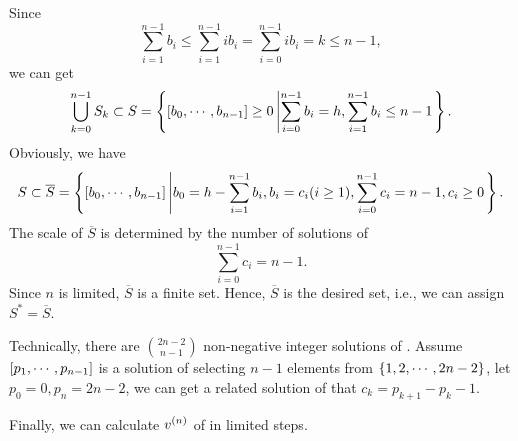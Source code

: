 Since
\begin{equation}
\sum_{i=1}^{n-1}{b_i}\le \sum_{i=1}^{n-1}{i b_i}=\sum_{i=0}^{n-1}{i b_i}=k\le n-1,
\end{equation}
we can get
\begin{equation}
\bigcup\limits_{k=0}^{n-1}S_k\subset S=\left\{\left[b_0,\cdots,b_{n-1}\right]\ge 0 \left| \sum_{i=0}^{n-1}{b_i}=h, \sum_{i=1}^{n-1}{b_i}\le n-1 \right.\right\}.
\end{equation}
Obviously, we have
\begin{equation}
S\subset \overline{S}=\left\{\left[b_0,\cdots,b_{n-1}\right]\left|b_0=h-\sum_{i=1}^{n-1}{b_i},b_i=c_i(i\ge 1),\sum_{i=0}^{n-1}c_i=n-1,c_i\ge 0\right.\right\}.
\end{equation}
The scale of $\overline{S}$ is determined by the number of solutions of
\begin{equation}
\sum_{i=0}^{n-1}c_i=n-1 \label{eqc}.
\end{equation}
Since $n$ is limited, $\overline{S}$ is a finite set.  Hence, $\overline{S}$ is the desired set, i.e., we can assign $S^*=\overline{S}$.

Technically, there are $\binom{2n-2}{n-1}$ non-negative integer solutions of . Assume  $\left[p_1,\cdots,p_{n-1}\right]$ is a solution of selecting $n-1$ elements from $\left\{1,2,\cdots,2n-2\right\}$, let  $p_0=0,p_n=2n-2$, we can get a related solution of  that $c_k=p_{k+1}-p_k-1$.

Finally, we can calculate $v^{(n)}$ of  in limited steps.

